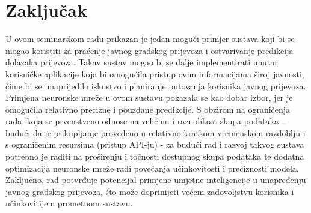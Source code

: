 \documentclass[seminarskirad]{fer}
\begin{document}
\chapter{Zaključak}
\label{pog:zakljucak}
U ovom seminarskom radu prikazan je jedan mogući primjer sustava koji bi se mogao koristiti za praćenje javnog gradskog prijevoza i ostvarivanje predikcija dolazaka prijevoza. Takav sustav mogao bi se dalje implementirati unutar korisničke aplikacije koja bi omogućila pristup ovim informacijama široj javnosti, čime bi se unaprijedilo iskustvo i planiranje putovanja korisnika javnog prijevoza. Primjena neuronske mreže u ovom sustavu pokazala se kao dobar izbor, jer je omogućila relativno precizne i pouzdane predikcije. S obzirom na ograničenja rada, koja se prvenstveno odnose na veličinu i raznolikost skupa podataka – budući da je prikupljanje provedeno u relativno kratkom vremenskom razdoblju i s ograničenim resursima (pristup API-ju) - za budući rad i razvoj takvog sustava potrebno je raditi na proširenju i točnosti dostupnog skupa podataka te dodatna optimizacija neuronske mreže radi povećanja učinkovitosti i preciznosti modela.
Zaključno, rad potvrđuje potencijal primjene umjetne inteligencije u unapređenju javnog gradskog prijevoza, što može doprinijeti većem zadovoljstvu korisnika i učinkovitijem prometnom sustavu.


\nocite{*}

\end{document}
